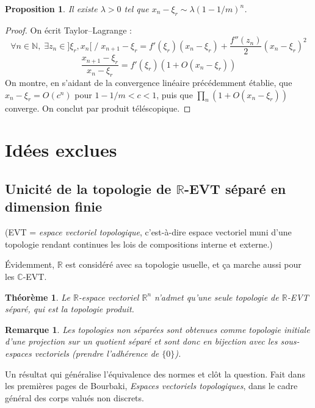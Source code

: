\documentclass[a4paper, 11pt]{article}
\def\N{\mathbb{N}}
\def\R{\mathbb{R}}
\def\C{\mathbb{C}}
\newtheorem*{proposition}{Proposition}
\newtheorem*{theorem}{Théorème}
\newtheorem*{remark}{Remarque}
\begin{document}
\begin{proposition}
  Il existe $\lambda > 0$ tel que $x_n - \xi_r \sim \lambda (1 - 1/m)^n$.
\end{proposition}
\begin{proof}
  On écrit Taylor--Lagrange :
  \[ \forall n \in \N,\; \exists z_n \in ]\xi_r, x_n[ \;/\;
    x_{n+1} - \xi_r = f'(\xi_r)(x_n - \xi_r)
    + \frac{f''(z_n)}{2} (x_n - \xi_r)^2
  \]
  \[ \frac{x_{n+1} - \xi_r}{x_n - \xi_r} = f'(\xi_r)\left( 1 + O(x_n - \xi_r)
    \right)
  \]
  On montre, en s'aidant de la convergence linéaire précédemment établie, que
  $x_n - \xi_r = O(c^n)$ pour $1-1/m < c < 1$, puis que $\prod_n \left( 1 +
    O(x_n - \xi_r) \right)$ converge. On conclut par produit téléscopique.
\end{proof}

\newpage


\section{Idées exclues}
\label{exclu}

\subsection{Unicité de la topologie de $\R$-EVT séparé en dimension finie}

(EVT = \emph{espace vectoriel topologique}, c'est-à-dire espace vectoriel muni
d'une topologie rendant continues les lois de compositions interne et externe.)

Évidemment, $\R$ est considéré avec sa topologie usuelle, et ça marche aussi
pour les $\C$-EVT.

\begin{theorem}
  Le $\R$-espace vectoriel $\R^n$ n'admet qu'une seule topologie de $\R$-EVT
  séparé, qui est la topologie produit.
\end{theorem}

\begin{remark}
  Les topologies non séparées sont obtenues comme topologie initiale d'une
  projection sur un quotient séparé et sont donc en bijection avec les
  sous-espaces vectoriels (prendre l'adhérence de $\{0\}$).
\end{remark}

Un résultat qui généralise l'équivalence des normes et clôt la question. Fait
dans les premières pages de Bourbaki, \emph{Espaces vectoriels topologiques},
dans le cadre général des corps valués non discrets.
\end{document}
